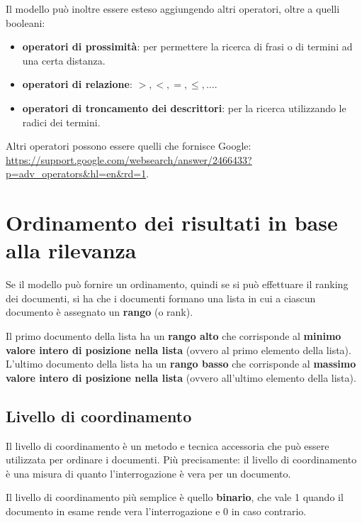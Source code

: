Il modello può inoltre essere esteso aggiungendo altri operatori, oltre a quelli booleani:

\begin{itemize}
	\item \textbf{operatori di prossimità}: per permettere la ricerca di frasi o di termini ad una certa distanza.
	\item \textbf{operatori di relazione}: $>, <, =, \leq, \ldots$.
	\item \textbf{operatori di troncamento dei descrittori}: per la ricerca utilizzando le radici dei termini.
\end{itemize}

\noindent Altri operatori possono essere quelli che fornisce Google: \url{https://support.google.com/websearch/answer/2466433?p=adv_operators\&hl=en\&rd=1}.

\section{Ordinamento dei risultati in base alla rilevanza}

Se il modello può fornire un ordinamento, quindi se si può effettuare il ranking dei documenti, si ha che i documenti formano una lista in cui a ciascun documento è assegnato un \textbf{rango} (o rank).

Il primo documento della lista ha un \textbf{rango alto} che corrisponde al \textbf{minimo valore intero di posizione nella lista} (ovvero al primo elemento della lista). L'ultimo documento della lista ha un \textbf{rango basso} che corrisponde al \textbf{massimo valore intero di posizione nella lista} (ovvero all'ultimo elemento della lista).

\subsection{Livello di coordinamento}

Il livello di coordinamento è un metodo e tecnica accessoria che può essere utilizzata per ordinare i documenti.
Più precisamente: il livello di coordinamento è una misura di quanto l'interrogazione è vera per un documento.

Il livello di coordinamento più semplice è quello \textbf{binario}, che vale 1 quando il documento in esame rende vera l'interrogazione e 0 in caso contrario.

